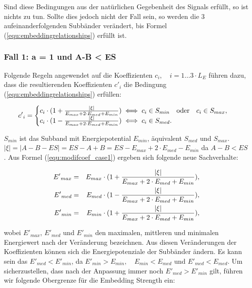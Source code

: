 Sind diese Bedingungen aus der natürlichen Gegebenheit des Signals erfüllt, so ist nichts zu tun. Sollte dies jedoch nicht der Fall sein, so werden die 3 aufeinanderfolgenden Subbänder verändert, bis Formel (\ref{equ:embeddingrelationships}) erfüllt ist. 

\subsubsection{Fall 1: a = 1 und A-B < ES} 

Folgende Regeln angewendet auf die Koeffizienten ${c}_{i},\quad i=1\dots{3\cdot{L}_{E}}$ führen dazu, dass die resultierenden Koeffizienten ${c'}_{i}$ die Bedingung (\ref{equ:embeddingrelationships}) erfüllen:

	 \begin{equation}
		 {c'}_{i} = \begin{cases}
    	 				{c}_{i} \cdot ( 1 + { |\xi| \over {{E}_{max} + 2\cdot {E}_{med} + {E}_{min}} }) \iff {c}_{i} \in {S}_{min} \quad\mbox{oder}\quad {c}_{i} \in {S}_{max}, 
						\\
    					{c}_{i} \cdot ( 1 - { |\xi| \over {{E}_{max} + 2\cdot {E}_{med} + {E}_{min}} }) \iff {c}_{i} \in {S}_{med}.
  				  	\end{cases}
		  \label{equ:modifcoef_case1}
	 \end{equation}
	 
${S}_{min}$ ist das Subband mit Energiepotential ${E}_{min}$, äquivalent ${S}_{med}$ und ${S}_{max}$. $|\xi| = |A-B-ES| = ES-A+B = ES - {E}_{max} + 2\cdot {E}_{med} - {E}_{min}$ da $A-B<ES$. Aus Formel (\ref{equ:modifcoef_case1}) ergeben sich folgende neue Sachverhalte:
	 
	 \begin{eqnarray*}
		 {E'}_{max} & = & {E}_{max} \cdot (1 + { |\xi| \over {{E}_{max} + 2\cdot {E}_{med} + {E}_{min}} }),
		 \\ 
		 {E'}_{med} & = & {E}_{med} \cdot (1 - { |\xi| \over {{E}_{max} + 2\cdot {E}_{med} + {E}_{min}} }),
		 \\
		 {E'}_{min} & = & {E}_{min} \cdot (1 + { |\xi| \over {{E}_{max} + 2\cdot {E}_{med} + {E}_{min}} }),
	\end{eqnarray*}	 
	 
wobei ${E'}_{max}$, ${E'}_{med}$ und ${E'}_{min}$ den maximalen, mittleren und minimalen Energiewert nach der Veränderung bezeichnen. Aus diesen Veränderungen der Koeffizienten können sich die Energiepotenziale der Subbänder ändern. Es kann sein das ${E'}_{med} < {E'}_{min}$, da ${E'}_{min}>{E}_{min},\quad {E}_{min}<{E}_{med}$ und ${E'}_{med}<{E}_{med}$. Um sicherzustellen, dass nach der Anpassung immer noch ${E'}_{med} > {E'}_{min}$ gilt, führen wir folgende Obergrenze für die Embedding Strength ein:

